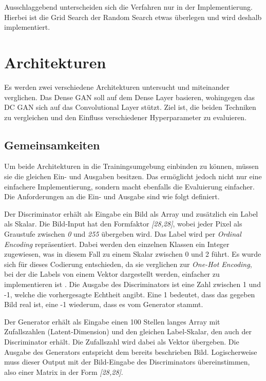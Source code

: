 Ausschlaggebend unterscheiden sich die Verfahren nur in der Implementierung.
Hierbei ist die Grid Search der Random Search etwas überlegen und wird deshalb implementiert.

\section{Architekturen}
Es werden zwei verschiedene Architekturen untersucht und miteinander verglichen.
Das Dense GAN soll auf dem Dense Layer basieren, wohingegen das DC GAN sich auf das Convolutional Layer stützt.
Ziel ist, die beiden Techniken zu vergleichen und den Einfluss verschiedener Hyperparameter zu evaluieren.

\subsection{Gemeinsamkeiten}
Um beide Architekturen in die Trainingsumgebung einbinden zu können, müssen sie die gleichen Ein- und Ausgaben besitzen.
Das ermöglicht jedoch nicht nur eine einfachere Implementierung, sondern macht ebenfalls die Evaluierung einfacher.
Die Anforderungen an die Ein- und Ausgabe sind wie folgt definiert.
\newline

Der Discriminator erhält als Eingabe ein Bild als Array und zusätzlich ein Label als Skalar.
Die Bild-Input hat den Formfaktor \textit{[28,28]}, wobei jeder Pixel als Graustufe zwischen \textit{0} und \textit{255} übergeben wird.
Das Label wird per \textit{Ordinal Encoding} repräsentiert.
Dabei werden den einzelnen Klassen ein Integer zugewiesen, was in diesem Fall zu einem Skalar zwischen 0 und 2 führt.
Es wurde sich für dieses Codierung entschieden, da sie verglichen zur \textit{One-Hot Encoding}, bei der die Labels von einem Vektor dargestellt werden, einfacher zu implementieren ist \cite{label_encoding}.
Die Ausgabe des Discriminators ist eine Zahl zwischen 1 und -1, welche die vorhergesagte Echtheit angibt.
Eine 1 bedeutet, dass das gegeben Bild real ist, eine -1 wiederum, dass es vom Generator stammt.
\newline

Der Generator erhält als Eingabe einen 100 Stellen langes Array mit Zufallszahlen (Latent-Dimension) und den gleichen Label-Skalar, den auch der Discriminator erhält.
Die Zufallszahl wird dabei als Vektor übergeben.
Die Ausgabe des Generators entspricht dem bereits beschrieben Bild.
Logischerweise muss dieser Output mit der Bild-Eingabe des Discriminators übereinstimmen, also einer Matrix in der Form \textit{[28,28]}.

